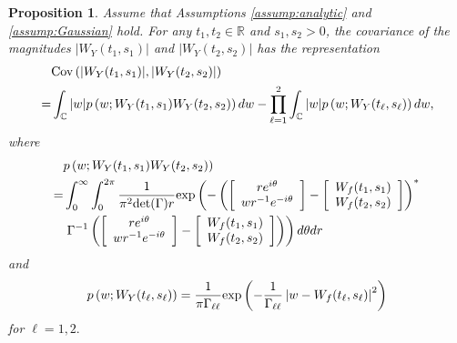 \documentclass{amsart}
\newtheorem{Proposition}{Proposition}
\begin{document}
\begin{Proposition}\label{prop:Cov_general}
Assume that Assumptions \ref{assump:analytic} and \ref{assump:Gaussian} hold.
For any $t_{1},t_{2}\in \mathbb{R}$ and $s_{1},s_{2}>0$,
the covariance of the magnitudes $|W_{Y}(t_{1},s_{1})|$ and $|W_{Y}(t_{2},s_{2})|$ has the representation
\begin{align}\label{format:cov:mag}
&\textup{Cov}\left(|W_{Y}(t_{1},s_{1})|,|W_{Y}(t_{2},s_{2})|\right)
\\\notag=&\int_{\mathbb{C}}|w|p\left(w;W_{Y}(t_{1},s_{1})W_{Y}(t_{2},s_{2})\right)dw
-\overset{2}{\underset{\ell=1}{\prod}}\int_{\mathbb{C}}|w|p\left(w;W_{Y}(t_{\ell},s_{\ell}) \right)dw,
\end{align}
where
\begin{align}\notag
&p\left(w;W_{Y}(t_{1},s_{1})W_{Y}(t_{2},s_{2})\right)
\\\notag=&
\int_{0}^{\infty}\int_{0}^{2\pi} \frac{1}{\pi^{2}\textup{det}(\Gamma)r}
\textup{exp}\left(-\left(
\left[\begin{array}{cc}re^{i\theta}\\ wr^{-1}e^{-i\theta}\end{array}\right]-\left[\begin{array}{cc}W_{f}(t_{1},s_{1})\\ W_{f}(t_{2},s_{2})\end{array}\right]\right)^{*}\right.
\\\label{prop:pdf:product}&\left.\Gamma^{-1}
\left(\left[\begin{array}{cc}re^{i\theta}\\ wr^{-1}e^{-i\theta}\end{array}\right]-\left[\begin{array}{cc}W_{f}(t_{1},s_{1})\\ W_{f}(t_{2},s_{2})\end{array}\right]\right)\right)d\theta dr
\end{align}
and
\begin{align*}
p\left(w;W_{Y}(t_{\ell},s_{\ell}) \right) = \frac{1}{\pi\Gamma_{\ell\ell}}
\textup{exp}\left(-\frac{1}{\Gamma_{\ell\ell}}\left|w-W_{f}(t_{\ell},s_{\ell})\right|^{2}\right)
\end{align*}
for $\ell=1,2.$
\end{Proposition}
\end{document}
